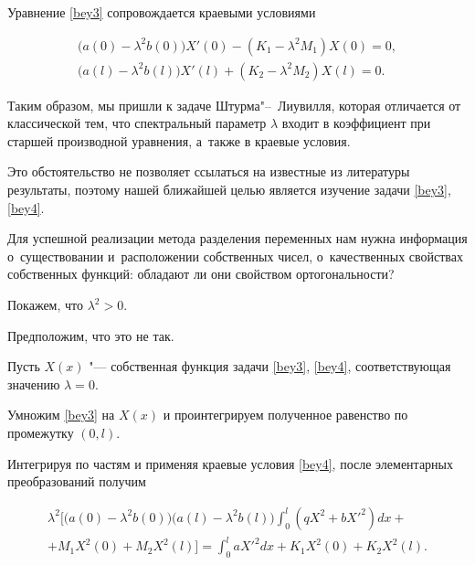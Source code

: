 Уравнение \eqref{bey3} сопровождается краевыми условиями

\begin{equation}

\label{bey4}

\begin{array}{lr}

\bigl(a(0)-\lambda^2b(0)\bigr)X'(0)-(K_1-\lambda^2M_1)X(0)=0,\\[2mm]

\bigl(a(l)-\lambda^2b(l)\bigr)X'(l)+(K_2-\lambda^2M_2)X(l)=0.

\end{array}

\end{equation}

Таким образом, мы пришли к задаче Штурма"--~Лиувилля, которая отличается от классической тем, что спектральный параметр $\lambda$ входит в коэффициент при старшей производной уравнения, а~также в краевые условия. 

Это обстоятельство не позволяет ссылаться на известные из литературы результаты, поэтому нашей ближайшей целью является изучение задачи \eqref{bey3}, \eqref{bey4}. 

Для успешной реализации метода разделения переменных нам нужна информация о~существовании и~расположении собственных чисел, о~качественных свойствах собственных функций: обладают ли они свойством ортогональности?



Покажем, что $\lambda^2>0$. 

Предположим, что это не так. 

Пусть $X(x)$ "--- собственная  функция задачи  \eqref{bey3}, \eqref{bey4}, соответствующая значению $\lambda=0$.

Умножим \eqref{bey3} на $X(x)$ и проинтегрируем полученное равенство по промежутку $(0, l)$. 

Интегрируя по частям и применяя краевые условия \eqref{bey4}, после элементарных преобразований получим

\begin{multline*}

\lambda^2

\biggl[\bigl(a(0)-\lambda^2b(0)\bigr)\bigl(a(l)-\lambda^2b(l)\bigr)\int _0^l(qX^2+bX'^2)dx+

\\

+M_1X^2(0)+M_2X^2(l)\biggr]=

\int_0^laX'^2dx+K_1X^2(0)+K_2X^2(l).

\end{multline*}

